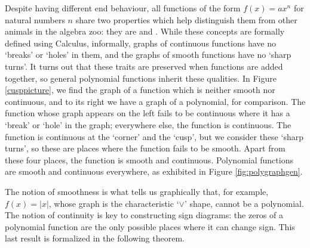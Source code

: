 \smallskip

Despite having different end behaviour, all functions of the form $f(x) = ax^{n}$ for natural numbers $n$ share two properties which help distinguish them from other animals in the algebra zoo:  they  are  and .  While these concepts are formally defined using Calculus, informally, graphs of continuous functions have no `breaks' or `holes' in them, and the graphs of smooth functions have no `sharp turns'.  It turns out that these traits are preserved when functions are added together, so general polynomial functions inherit these qualities.  In Figure \ref{cusppicture}, we find the graph of a function which is neither smooth nor continuous, and to its right we have a graph of a polynomial, for comparison.  The function whose graph appears on the left fails to be continuous where it has a `break' or `hole' in the graph;  everywhere else, the function is continuous.  The function is continuous at the `corner' and the `cusp', but we consider these `sharp turns', so these are places where the function fails to be smooth.  Apart from these four places, the function is smooth and continuous.  Polynomial functions are smooth and continuous everywhere, as exhibited in Figure \ref{fig:polygraphgen}.






The notion of smoothness is what tells us graphically that, for example, $f(x) = |x|$, whose graph is the characteristic `$\vee$' shape, cannot be a polynomial.  The notion of continuity is key to constructing sign diagrams: the zeros of a polynomial function are the only possible places where it can change sign. This last result is formalized in the following theorem.
  
\smallskip


